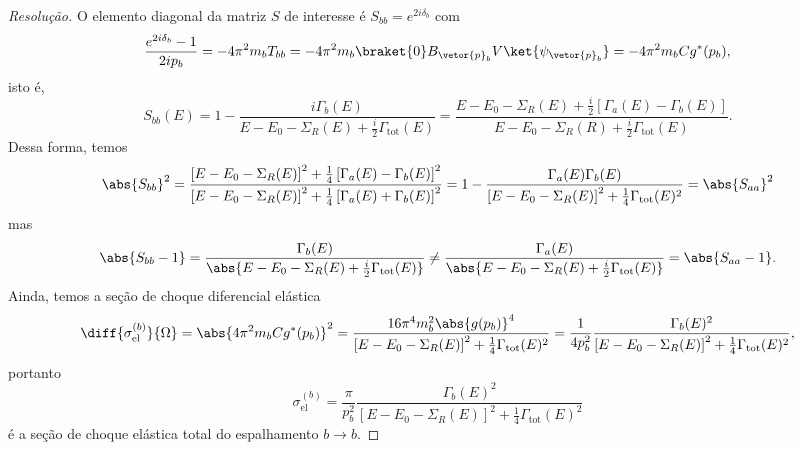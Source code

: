 \begin{proof}[Resolução]
   O elemento diagonal da matriz \(S\) de interesse é \(S_{bb} = e^{2i \delta_{b}}\) com
   \begin{equation*}
      \frac{e^{2i \delta_{b}}-1}{2ip_b} = -4\pi^2 m_b T_{bb} = -4\pi^2 m_b \braket{0}B_{\vetor{p}_b} V\ket{\psi_{\vetor{p}_b}} = -4\pi^2 m_b C g^*(p_b),
   \end{equation*}
   isto é,
   \begin{equation*}
      S_{bb}(E) = 1 - \frac{i\Gamma_b(E)}{E - E_0 - \Sigma_R(E) + \frac{i}2 \Gamma_\mathrm{tot}(E)} = \frac{E - E_0 - \Sigma_R(E) + \frac{i}{2}\left[\Gamma_a(E) - \Gamma_b(E)\right]}{E - E_0 - \Sigma_R(R) + \frac{i}{2} \Gamma_{\mathrm{tot}}(E)}.
   \end{equation*}
   Dessa forma, temos
   \begin{equation*}
      \abs{S_{bb}}^2 = \frac{\left[E - E_0 - \Sigma_R(E)\right]^2 + \frac14 \left[\Gamma_a(E) - \Gamma_b(E)\right]^2}{\left[E - E_0 - \Sigma_R(E)\right]^2 + \frac14 \left[\Gamma_a(E) + \Gamma_b(E)\right]^2} = 1 - \frac{\Gamma_a(E) \Gamma_b(E)}{\left[E - E_0 - \Sigma_R(E)\right]^2 + \frac14 \Gamma_\mathrm{tot}(E)^2} = \abs{S_{aa}}^2
   \end{equation*}
   mas
   \begin{equation*}
      \abs{S_{bb} - 1} = \frac{\Gamma_b(E)}{\abs{E - E_0 - \Sigma_R(E) + \frac{i}{2}\Gamma_\mathrm{tot}(E)}} \neq \frac{\Gamma_a(E)}{\abs{E - E_0 - \Sigma_R(E) + \frac{i}{2}\Gamma_\mathrm{tot}(E)}} = \abs{S_{aa} - 1}.
   \end{equation*}
   Ainda, temos a seção de choque diferencial elástica
   \begin{equation*}
      \diff{\sigma_\mathrm{el}^{(b)}}{\Omega} = \abs{4\pi^2 m_b C g^*(p_b)}^2 = \frac{16\pi^4 m_b^2 \abs{g(p_b)}^4}{\left[E - E_0 - \Sigma_R(E)\right]^2 + \frac14 \Gamma_\mathrm{tot}(E)^2} = \frac{1}{4 p_b^2}\frac{\Gamma_b(E)^2}{\left[E - E_0 - \Sigma_R(E)\right]^2 + \frac14 \Gamma_\mathrm{tot}(E)^2},
   \end{equation*}
   portanto
   \begin{equation*}
      \sigma_\mathrm{el}^{(b)} = \frac{\pi}{p_b^2} \frac{\Gamma_b(E)^2}{\left[E - E_0 - \Sigma_R(E)\right]^2 + \frac14 \Gamma_\mathrm{tot}(E)^2}
   \end{equation*}
   é a seção de choque elástica total do espalhamento \(b \to b\).
\end{proof}
